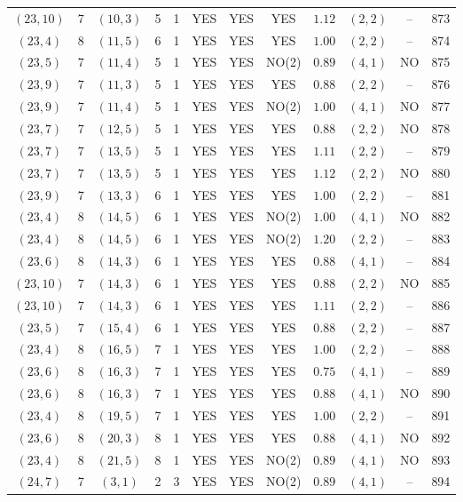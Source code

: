 \begin{longtable}{|c|c|c|c|c|c|c|c|c|c|c|c|}
$(23,10)$ & 7 & $(10,3)$ & 5 & 1 & YES & YES & YES & $1.12$ & $(2,2)$ & -- & 873\\
$(23,4)$ & 8 & $(11,5)$ & 6 & 1 & YES & YES & YES & $1.00$ & $(2,2)$ & -- & 874\\
$(23,5)$ & 7 & $(11,4)$ & 5 & 1 & YES & YES & NO(2) & $0.89$ & $(4,1)$ & NO & 875\\
$(23,9)$ & 7 & $(11,3)$ & 5 & 1 & YES & YES & YES & $0.88$ & $(2,2)$ & -- & 876\\
$(23,9)$ & 7 & $(11,4)$ & 5 & 1 & YES & YES & NO(2) & $1.00$ & $(4,1)$ & NO & 877\\
$(23,7)$ & 7 & $(12,5)$ & 5 & 1 & YES & YES & YES & $0.88$ & $(2,2)$ & NO & 878\\
$(23,7)$ & 7 & $(13,5)$ & 5 & 1 & YES & YES & YES & $1.11$ & $(2,2)$ & -- & 879\\
$(23,7)$ & 7 & $(13,5)$ & 5 & 1 & YES & YES & YES & $1.12$ & $(2,2)$ & NO & 880\\
$(23,9)$ & 7 & $(13,3)$ & 6 & 1 & YES & YES & YES & $1.00$ & $(2,2)$ & -- & 881\\
$(23,4)$ & 8 & $(14,5)$ & 6 & 1 & YES & YES & NO(2) & $1.00$ & $(4,1)$ & NO & 882\\
$(23,4)$ & 8 & $(14,5)$ & 6 & 1 & YES & YES & NO(2) & $1.20$ & $(2,2)$ & -- & 883\\
$(23,6)$ & 8 & $(14,3)$ & 6 & 1 & YES & YES & YES & $0.88$ & $(4,1)$ & -- & 884\\
$(23,10)$ & 7 & $(14,3)$ & 6 & 1 & YES & YES & YES & $0.88$ & $(2,2)$ & NO & 885\\
$(23,10)$ & 7 & $(14,3)$ & 6 & 1 & YES & YES & YES & $1.11$ & $(2,2)$ & -- & 886\\
$(23,5)$ & 7 & $(15,4)$ & 6 & 1 & YES & YES & YES & $0.88$ & $(2,2)$ & -- & 887\\
$(23,4)$ & 8 & $(16,5)$ & 7 & 1 & YES & YES & YES & $1.00$ & $(2,2)$ & -- & 888\\
$(23,6)$ & 8 & $(16,3)$ & 7 & 1 & YES & YES & YES & $0.75$ & $(4,1)$ & -- & 889\\
$(23,6)$ & 8 & $(16,3)$ & 7 & 1 & YES & YES & YES & $0.88$ & $(4,1)$ & NO & 890\\
$(23,4)$ & 8 & $(19,5)$ & 7 & 1 & YES & YES & YES & $1.00$ & $(2,2)$ & -- & 891\\
$(23,6)$ & 8 & $(20,3)$ & 8 & 1 & YES & YES & YES & $0.88$ & $(4,1)$ & NO & 892\\
$(23,4)$ & 8 & $(21,5)$ & 8 & 1 & YES & YES & NO(2) & $0.89$ & $(4,1)$ & NO & 893\\
$(24,7)$ & 7 & $(3,1)$ & 2 & 3 & YES & YES & NO(2) & $0.89$ & $(4,1)$ & -- & 894\\

\end{longtable}
